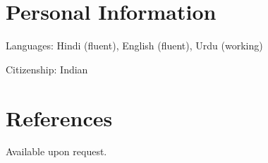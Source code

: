 \documentclass[10pt]{article}
\begin{document}
\section{\sc Personal Information}

Languages: Hindi (fluent), English (fluent), Urdu (working)

Citizenship: Indian

\section{\sc References}

Available upon request.

\end{document}
